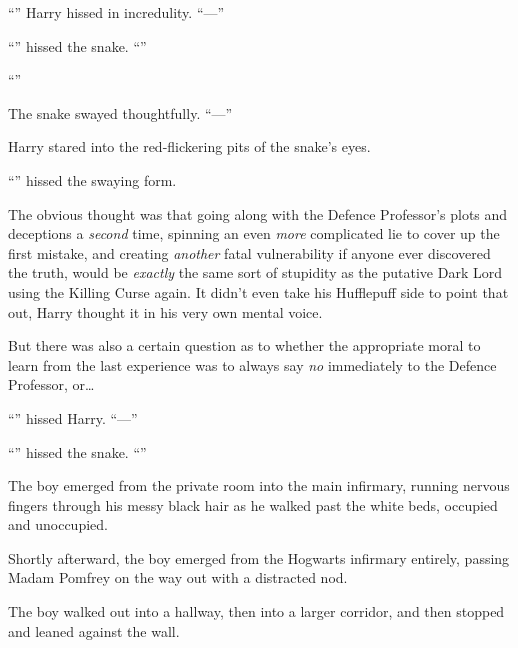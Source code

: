 “” Harry hissed in incredulity. “—”

“” hissed the snake. “”

“”

The snake swayed thoughtfully. “—”

Harry stared into the red-flickering pits of the snake’s eyes.

“” hissed the swaying form.

The obvious thought was that going along with the Defence Professor’s plots and deceptions a \emph{second} time, spinning an even \emph{more} complicated lie to cover up the first mistake, and creating \emph{another} fatal vulnerability if anyone ever discovered the truth, would be \emph{exactly} the same sort of stupidity as the putative Dark Lord using the Killing Curse again. It didn’t even take his Hufflepuff side to point that out, Harry thought it in his very own mental voice.

But there was also a certain question as to whether the appropriate moral to learn from the last experience was to always say \emph{no} immediately to the Defence Professor, or…

“” hissed Harry. “—”

“” hissed the snake. “”

\later

The boy emerged from the private room into the main infirmary, running nervous fingers through his messy black hair as he walked past the white beds, occupied and unoccupied.

Shortly afterward, the boy emerged from the Hogwarts infirmary entirely, passing Madam Pomfrey on the way out with a distracted nod.

The boy walked out into a hallway, then into a larger corridor, and then stopped and leaned against the wall.

